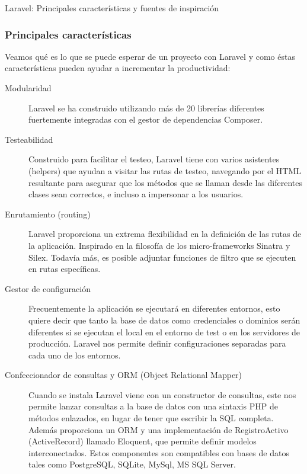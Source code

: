 Laravel: Principales características y fuentes de inspiración

\subsubsection{Principales características}

Veamos qué es lo que se puede esperar de un proyecto con Laravel y como éstas características pueden ayudar a incrementar la productividad:

\begin{description}
    \item[Modularidad] Laravel se ha construido utilizando más de 20 librerías diferentes fuertemente integradas con el gestor de dependencias Composer.
    
    \item[Testeabilidad] Construido para facilitar el testeo, Laravel tiene con varios asistentes (helpers) que ayudan a visitar las rutas de testeo, navegando por el HTML resultante para asegurar que los métodos que se llaman desde las diferentes clases sean correctos, e incluso a impersonar a los usuarios.
    
    \item[Enrutamiento (routing)] Laravel proporciona un extrema flexibilidad en la definición de las rutas de la aplicación. Inspirado en la filosofía de los micro-frameworks Sinatra y Silex. Todavía más, es posible adjuntar funciones de filtro que se ejecuten en rutas específicas.
    
    \item[Gestor de configuración] Frecuentemente la aplicación se ejecutará en diferentes entornos, esto quiere decir que tanto la base de datos como credenciales o dominios serán diferentes si se ejecutan el local en el entorno de test o en los servidores de producción. Laravel nos permite definir configuraciones separadas para cada uno de los entornos.
    
    \item[Confeccionador de consultas y ORM (Object Relational Mapper)] Cuando se instala Laravel viene con un constructor de consultas, este nos permite lanzar consultas a la base de datos con una sintaxis PHP de métodos enlazados, en lugar de tener que escribir la SQL completa. Además proporciona un ORM y una implementación de RegistroActivo (ActiveRecord) llamado Eloquent, que permite definir modelos interconectados. Estos componentes son compatibles con bases de datos tales como PostgreSQL, SQLite, MySql, MS SQL Server.
    

\end{description}
